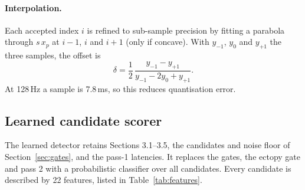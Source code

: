 \documentclass[11pt,a4paper]{article}
\begin{document}
\paragraph{Interpolation.} Each accepted index $i$ is refined to sub-sample precision by fitting a parabola through $s\,x_p$ at $i-1$, $i$ and $i+1$ (only if concave). With $y_{-1}$, $y_0$ and $y_{+1}$ the three samples, the offset is
\begin{equation}
\delta = \frac{1}{2}\,\frac{y_{-1} - y_{+1}}{y_{-1} - 2y_0 + y_{+1}}.
\end{equation}
At 128\,Hz a sample is 7.8\,ms, so this reduces quantisation error.

\subsection{Learned candidate scorer}

The learned detector retains Sections 3.1--3.5, the candidates and noise floor of Section~\ref{sec:gates}, and the pass-1 latencies. It replaces the gates, the ectopy gate and pass 2 with a probabilistic classifier over all candidates. Every candidate is described by 22 features, listed in Table~\ref{tab:features}.
\end{document}
